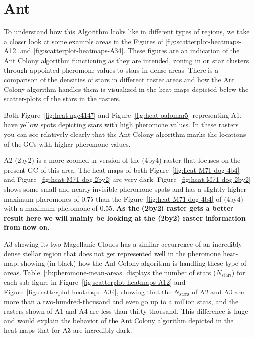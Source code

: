 \newpage

\section{Ant}


To understand how this Algorithm looks like in different types of regions, we take a closer look at some example areas in the Figures of \ref{fig:scatterplot-heatmaps-A12} and \ref{fig:scatterplot-heatmaps-A34}. These figures are an indication of the Ant Colony algorithm functioning as they are intended, zoning in on star clusters through appointed pheromone values to stars in dense areas. There is a comparison of the densities of stars in different raster areas and how the Ant Colony algorithm handles them is visualized in the heat-maps depicted below the scatter-plots of the stars in the rasters.

Both Figure~\ref{fig:heat-ngc4147} and Figure~\ref{fig:heat-palomar5} representing A1, have yellow spots depicting stars with high pheromone values. In these rasters you can see relatively clearly that the Ant Colony algorithm marks the locations of the GCs with higher pheromone values.

A2 (2by2) is a more zoomed in version of the (4by4) raster that focuses on the present GC of this area. The heat-maps of both Figure~\ref{fig:heat-M71-dog-4b4} and Figure~\ref{fig:heat-M71-dog-2by2} are very dark. Figure~\ref{fig:heat-M71-dog-2by2} shows some small and nearly invisible pheromone spots and has a slightly higher maximum pheromones of \num{0.75} than the Figure~\ref{fig:heat-M71-dog-4b4} of (4by4) with a maximum pheromone of \num{0.55}. \textbf{As the (2by2) raster gets a better result here we will mainly be looking at the (2by2) raster information from now on.}

A3 showing its two Magellanic Clouds has a similar occurrence of an incredibly dense stellar region that does not get represented well in the pheromone heat-map, showing (in black) how the Ant Colony algorithm is handling these type of areas. Table~\ref{tb:pheromone-mean-areas} displays the number of stars ($N_{\text{stars}}$) for each sub-figure in Figure~\ref{fig:scatterplot-heatmaps-A12} and Figure~\ref{fig:scatterplot-heatmaps-A34}, showing that the $N_{\text{stars}}$ of A2 and A3 are more than a two-hundred-thousand and even go up to a million stars, and the rasters shown of A1 and A4 are less than thirty-thousand. This difference is huge and would explain the behavior of the Ant Colony algorithm depicted in the heat-maps that for A3 are incredibly dark.

